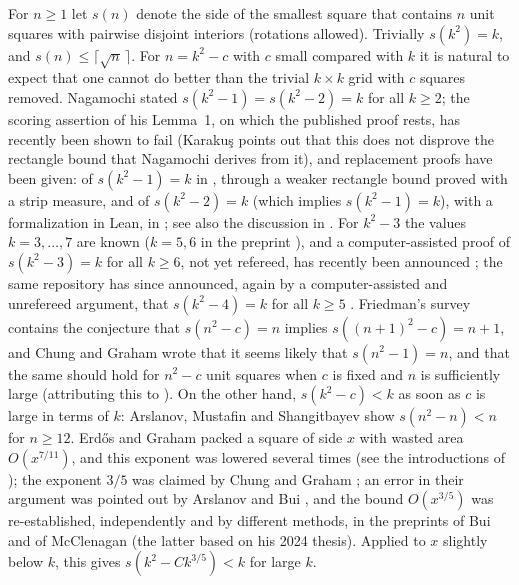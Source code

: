 \documentclass[11pt]{amsart}
\theoremstyle{definition}
\theoremstyle{remark}
\begin{document}
For $n\ge 1$ let $s(n)$ denote the side of the smallest square that contains $n$ unit squares with pairwise
disjoint interiors (rotations allowed). Trivially $s(k^2)=k$, and $s(n)\le \lceil\sqrt n\,\rceil$.
For $n=k^2-c$ with $c$ small compared with $k$ it is natural to expect that one cannot do better than the trivial
$k\times k$ grid with $c$ squares removed. Nagamochi \cite{Nag} stated $s(k^2-1)=s(k^2-2)=k$ for all $k\ge2$;
the scoring assertion of his Lemma~1, on which the published proof rests, has recently been shown to fail
\cite{Che,Kar} (Karaku\c{s} points out that this does not disprove the rectangle bound that Nagamochi derives from
it), and replacement proofs have been given: of $s(k^2-1)=k$ in \cite{Kar}, through a weaker rectangle bound proved with
a strip measure, and of $s(k^2-2)=k$ (which implies $s(k^2-1)=k$), with a formalization in Lean, in \cite{Che}; see also
the discussion in \cite{Dan}. For $k^2-3$ the values $k=3,\dots,7$ are known
\cite{KS,Ben10,Ben16} ($k=5,6$ in the preprint \cite{Ben16}), and a computer-assisted proof of $s(k^2-3)=k$ for all $k\ge 6$, not yet refereed, has recently
been announced \cite{Dan}; the same repository has since announced, again by a computer-assisted and unrefereed argument, that
$s(k^2-4)=k$ for all $k\ge5$ \cite[directory \texttt{s12/certificates/k2m4}]{Dan}. Friedman's survey \cite{Fri} contains the conjecture that $s(n^2-c)=n$ implies $s((n+1)^2-c)=n+1$, and Chung and
Graham \cite[concluding remarks]{CG09} wrote that it seems likely that $s(n^2-1)=n$, and that the same should hold for
$n^2-c$ unit squares when $c$ is fixed and $n$ is sufficiently large (attributing this to \cite{Fri}).
On the other hand, $s(k^2-c)<k$ as soon as $c$ is large in terms of $k$: Arslanov, Mustafin and Shangitbayev
\cite{AMS} show $s(n^2-n)<n$ for $n\ge 12$. Erd\H{o}s and Graham \cite{EG} packed a square of side $x$ with wasted
area $O(x^{7/11})$, and this exponent was lowered several times (see the introductions of \cite{McC,Bui}); the exponent $3/5$
was claimed by Chung and Graham \cite{CG}; an error in their argument was
pointed out by Arslanov and Bui \cite{AB}, and the bound $O(x^{3/5})$ was re-established, independently and by different methods,
in the preprints of Bui \cite{Bui} and of McClenagan \cite{McC} (the latter based on his 2024 thesis). Applied to $x$ slightly below $k$, this gives $s(k^2-Ck^{3/5})<k$ for large $k$.
\end{document}
